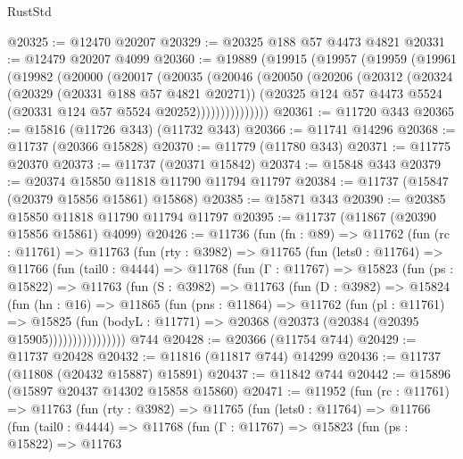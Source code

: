 \begin{lexlean}{RustStd}
\begin{coremodule}
@20325 := @12470 @20207
@20329 := @20325 @188 @57 @4473 @4821
@20331 := @12479 @20207 @4099
@20360 := @19889
    (@19915
      (@19957
        (@19959
          (@19961
            (@19982
              (@20000
                (@20017
                  (@20035
                    (@20046
                      (@20050
                        (@20206
                          (@20312
                            (@20324
                              (@20329 (@20331 @188 @57 @4821 @20271))
                              (@20325
                                @124
                                @57
                                @4473
                                @5524
                                (@20331 @124 @57 @5524 @20252)))))))))))))))
@20361 := @11720 @343
@20365 := @15816 (@11726 @343) (@11732 @343)
@20366 := @11741 @14296
@20368 := @11737 (@20366 @15828)
@20370 := @11779 (@11780 @343)
@20371 := @11775 @20370
@20373 := @11737 (@20371 @15842)
@20374 := @15848 @343
@20379 := @20374 @15850 @11818 @11790 @11794 @11797
@20384 := @11737 (@15847 (@20379 @15856 @15861) @15868)
@20385 := @15871 @343
@20390 := @20385 @15850 @11818 @11790 @11794 @11797
@20395 := @11737 (@11867 (@20390 @15856 @15861) @4099)
@20426 := @11736
    (fun (fn : @89) =>
    @11762
      (fun (rc : @11761) =>
      @11763
        (fun (rty : @3982) =>
        @11765
          (fun (lets0 : @11764) =>
          @11766
            (fun (tail0 : @4444) =>
            @11768
              (fun (Γ : @11767) =>
              @15823
                (fun (ps : @15822) =>
                @11763
                  (fun (S : @3982) =>
                  @11763
                    (fun (D : @3982) =>
                    @15824
                      (fun (hn : @16) =>
                      @11865
                        (fun (pns : @11864) =>
                        @11762
                          (fun (pl : @11761) =>
                          @15825
                            (fun (bodyL : @11771) =>
                            @20368 (@20373 (@20384 (@20395 @15905))))))))))))))))
    @744
@20428 := @20366 (@11754 @744)
@20429 := @11737 @20428
@20432 := @11816 (@11817 @744) @14299
@20436 := @11737 (@11808 (@20432 @15887) @15891)
@20437 := @11842 @744
@20442 := @15896 (@15897 @20437 @14302 @15858 @15860)
@20471 := @11952
    (fun (rc : @11761) =>
    @11763
      (fun (rty : @3982) =>
      @11765
        (fun (lets0 : @11764) =>
        @11766
          (fun (tail0 : @4444) =>
          @11768
            (fun (Γ : @11767) =>
            @15823
              (fun (ps : @15822) =>
              @11763

\end{coremodule}
\end{lexlean}
